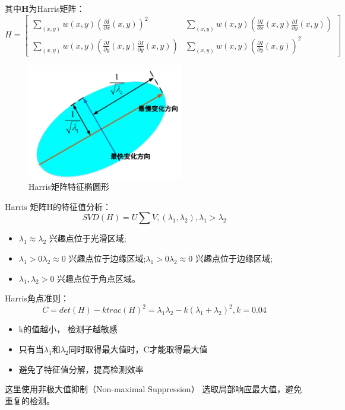 \documentclass[fontset=windows]{article}
\begin{document}
其中$\mathbf{H}$为Harris矩阵：
\begin{equation*}
H=
\begin{bmatrix}
	\sum_{(x,y)}^{}w(x,y)(\frac{\partial I}{\partial x}(x,y))^2 & \sum_{(x,y)}^{}w(x,y)(\frac{\partial I}{\partial x}(x,y)\frac{\partial I}{\partial y}(x,y)) \\
	\sum_{(x,y)}^{}w(x,y)(\frac{\partial I}{\partial y}(x,y)\frac{\partial I}{\partial y}(x,y)) & \sum_{(x,y)}^{}w(x,y)(\frac{\partial I}{\partial y}(x,y))^2
\end{bmatrix}
\end{equation*}

\begin{figure}[h]
    \centering
    \includegraphics[height=2in]{harrisShape.png}
    \caption{Harris矩阵特征椭圆形}
    \label{fig:harrisShape}
\end{figure}

Harris 矩阵H的特征值分析：
\begin{equation*}
	SVD(H) = U \sum V, (\lambda_1, \lambda_2), \lambda_1 > \lambda_2
\end{equation*}
\begin{itemize}[leftmargin=2cm]
	\item $\lambda_1 \approx \lambda_2$ 兴趣点位于光滑区域;
	\item $\lambda_1 > 0  \lambda_2 \approx 0$ 兴趣点位于边缘区域;$\lambda_1 > 0  \lambda_2 \approx 0$ 兴趣点位于边缘区域;
	\item $\lambda_1, \lambda_2 > 0$ 兴趣点位于角点区域。
\end{itemize}

Harris角点准则：
\begin{equation*}
	C = det(H) - ktrac(H)^2 = \lambda_1\lambda_2 - k(\lambda_1 + \lambda_2)^2, k = 0.04
\end{equation*}
\begin{itemize}[leftmargin=2cm]
	\item k的值越小， 检测子越敏感
	\item 只有当$\lambda_1$和$\lambda_2$同时取得最大值时，C才能取得最大值
	\item 避免了特征值分解，提高检测效率
\end{itemize}
这里使用非极大值抑制（Non-maximal Suppression）
选取局部响应最大值，避免重复的检测。

\end{document}
